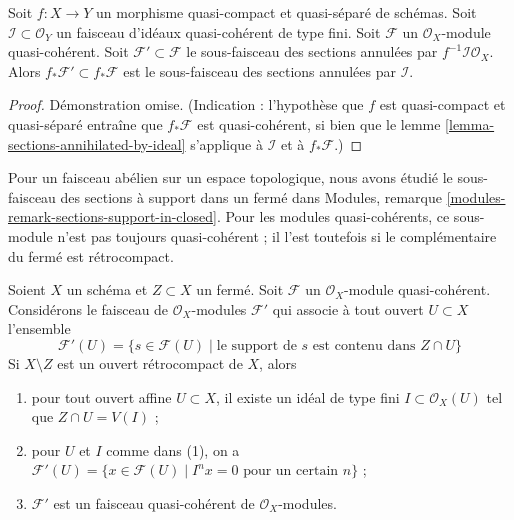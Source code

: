 \begin{lemma}
\label{lemma-push-sections-annihilated-by-ideal}
Soit $f : X \to Y$ un morphisme quasi-compact et quasi-séparé
de schémas. Soit $\mathcal{I} \subset \mathcal{O}_Y$ un faisceau d'idéaux
quasi-cohérent de type fini. Soit $\mathcal{F}$ un
$\mathcal{O}_X$-module quasi-cohérent. Soit $\mathcal{F}' \subset \mathcal{F}$
le sous-faisceau des sections annulées par $f^{-1}\mathcal{I}\mathcal{O}_X$.
Alors $f_*\mathcal{F}' \subset f_*\mathcal{F}$ est le sous-faisceau
des sections annulées par $\mathcal{I}$.
\end{lemma}

\begin{proof}
Démonstration omise. (Indication : l'hypothèse que $f$ est quasi-compact et
quasi-séparé entraîne que $f_*\mathcal{F}$ est quasi-cohérent,
si bien que le lemme \ref{lemma-sections-annihilated-by-ideal} s'applique
à $\mathcal{I}$ et à $f_*\mathcal{F}$.)
\end{proof}

\noindent
Pour un faisceau abélien sur un espace topologique, nous avons étudié le sous-faisceau
des sections à support dans un fermé dans
Modules, remarque \ref{modules-remark-sections-support-in-closed}.
Pour les modules quasi-cohérents, ce sous-module n'est pas toujours
quasi-cohérent ; il l'est toutefois si le complémentaire du fermé
est rétrocompact.

\begin{lemma}
\label{lemma-sections-supported-on-closed-subset}
Soient $X$ un schéma et $Z \subset X$ un fermé.
Soit $\mathcal{F}$ un $\mathcal{O}_X$-module quasi-cohérent.
Considérons le faisceau de $\mathcal{O}_X$-modules $\mathcal{F}'$
qui associe à tout ouvert $U \subset X$ l'ensemble
$$
\mathcal{F}'(U)
=
\{s \in \mathcal{F}(U) \mid
\text{le support de }s\text{ est contenu dans }Z \cap U\}
$$
Si $X \setminus Z$ est un ouvert rétrocompact de $X$, alors
\begin{enumerate}
\item pour tout ouvert affine $U \subset X$, il existe un idéal de type fini
$I \subset \mathcal{O}_X(U)$ tel que $Z \cap U = V(I)$ ;
\item pour $U$ et $I$ comme dans (1), on a
$\mathcal{F}'(U) = \{x \in \mathcal{F}(U) \mid
I^nx = 0 \text{ pour un certain } n\}$ ;
\item $\mathcal{F}'$ est un faisceau quasi-cohérent de $\mathcal{O}_X$-modules.
\end{enumerate}
\end{lemma}

